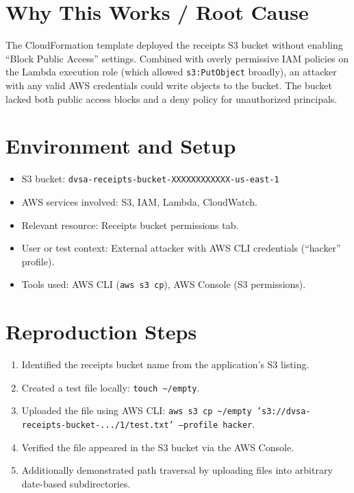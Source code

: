 \documentclass[12pt]{report}
\begin{document}
\section{Why This Works / Root Cause}
The CloudFormation template deployed the receipts S3 bucket without enabling ``Block Public Access'' settings. Combined with overly permissive IAM policies on the Lambda execution role (which allowed \texttt{s3:PutObject} broadly), an attacker with any valid AWS credentials could write objects to the bucket. The bucket lacked both public access blocks and a deny policy for unauthorized principals.

\section{Environment and Setup}
\begin{itemize}
  \item S3 bucket: \texttt{dvsa-receipts-bucket-XXXXXXXXXXXX-us-east-1}
  \item AWS services involved: S3, IAM, Lambda, CloudWatch.
  \item Relevant resource: Receipts bucket permissions tab.
  \item User or test context: External attacker with AWS CLI credentials (``hacker'' profile).
  \item Tools used: AWS CLI (\texttt{aws s3 cp}), AWS Console (S3 permissions).
\end{itemize}

\section{Reproduction Steps}
\begin{enumerate}
  \item Identified the receipts bucket name from the application's S3 listing.
  \item Created a test file locally: \texttt{touch \textasciitilde/empty}.
  \item Uploaded the file using AWS CLI: \texttt{aws s3 cp \textasciitilde/empty 's3://dvsa-receipts-bucket-.../1/test.txt' --profile hacker}.
  \item Verified the file appeared in the S3 bucket via the AWS Console.
  \item Additionally demonstrated path traversal by uploading files into arbitrary date-based subdirectories.
\end{enumerate}
\end{document}
